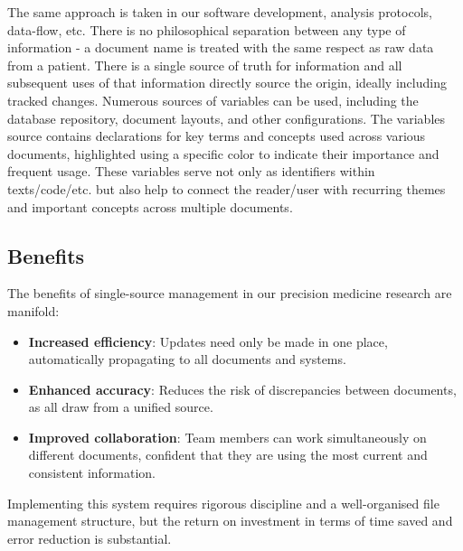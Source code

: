 The same approach is taken in our software development, analysis protocols, data-flow, etc. 
There is no philosophical separation between any type of information - 
a document name is treated with the same respect as raw data from a patient.
There is a single source of truth for information and all subsequent uses of that information directly source the origin, ideally including tracked changes. 
Numerous sources of variables can be used, including the database repository, 
document layouts, 
and other configurations. 
The variables source contains declarations for key terms and concepts used across various documents, highlighted using a specific color to indicate their importance and frequent usage.
These variables serve not only as identifiers within texts/code/etc. but also help to  connect the reader/user with recurring themes and important concepts across multiple documents. 


\subsection{Benefits}

The benefits of single-source management in our precision medicine research are manifold:
\begin{itemize}
    \item \textbf{Increased efficiency}: Updates need only be made in one place, automatically propagating to all documents and systems.
    \item \textbf{Enhanced accuracy}: Reduces the risk of discrepancies between documents, as all draw from a unified source.
    \item \textbf{Improved collaboration}: Team members can work simultaneously on different documents, confident that they are using the most current and consistent information.
\end{itemize}

Implementing this system requires rigorous discipline and a well-organised file management structure, but the return on investment in terms of time saved and error reduction is substantial.
